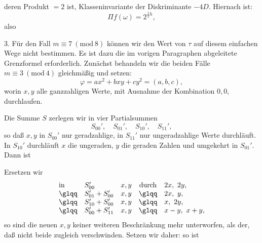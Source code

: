 deren Produkt $= 2$ ist, Klasseninvariante der Diskriminante $-4D$.
Hiernach ist:
\[
\Pi f(\omega) = 2^{\frac{1}{3}h},
\]
also

3. Für den Fall $m \equiv 7\ (\mathrm{mod}\ 8)$ können wir den
Wert von $\tau$ auf diesem einfachen Wege nicht bestimmen. Es ist dazu
die im vorigen Paragraphen abgeleitete Grenzformel erforderlich. Zunächst
behandeln wir die beiden Fälle $m \equiv 3\ (\mathrm{mod}\ 4)$
gleichmäßig und setzen:
\[
\varphi = ax^2 + bxy + cy^2 = (a,b,c),
\]
worin $x, y$ alle ganzzahligen Werte, mit Ausnahme der Kombination
$0, 0$, durchlaufen.

Die Summe $S$ zerlegen wir in vier Partialsummen
\[
S_{00}', \quad S_{01}', \quad S_{10}', \quad S_{11}',
\]
so daß $x, y$ in $S_{00}'$ nur geradzahlige, in $S_{11}'$ nur
ungeradzahlige Werte durchläuft. In $S_{10}'$ durchläuft $x$ die
ungeraden, $y$ die geraden Zahlen und umgekehrt in $S_{01}'$. Dann ist

Ersetzen wir
\[
\begin{array}{l@{\quad}l@{\quad}l@{\quad}c@{\quad}l}
\text{in} & S_{00}' & x,y & \text{durch} & 2x,\ 2y,\\
\text{\glqq} & S_{01}'+S_{00}' & x,y & \text{\glqq} & 2x,\ y,\\
\text{\glqq} & S_{10}'+S_{00}' & x,y & \text{\glqq} & x,\ 2y,\\
\text{\glqq} & S_{00}'+S_{11}' & x,y & \text{\glqq} & x-y,\ x+y,
\end{array}
\]
so sind die neuen $x, y$ keiner weiteren Beschränkung mehr unterworfen,
als der, daß nicht beide zugleich verschwinden. Setzen wir daher:
so ist
